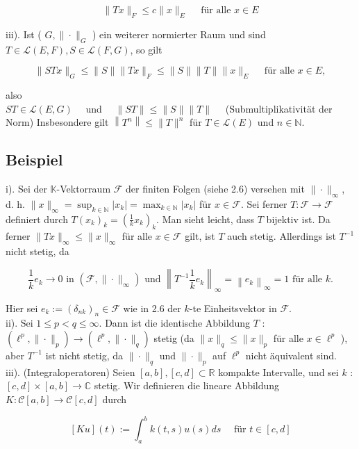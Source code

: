 \documentclass[10pt, letterpaper]{article}
\begin{document}
$$
\|T x\|_{F} \leq c\|x\|_{E} \quad \text { für alle } x \in E
$$

iii). Ist ( $G,\|\cdot\|_{G}$ ) ein weiterer normierter Raum und sind $T \in \mathcal{L}(E, F), S \in \mathcal{L}(F, G)$, so gilt

$$
\|S T x\|_{G} \leq\|S\|\|T x\|_{F} \leq\|S\|\|T\|\|x\|_{E} \quad \text { für alle } x \in E,
$$

also\\
$S T \in \mathcal{L}(E, G) \quad$ und $\quad\|S T\| \leq\|S\|\|T\| \quad$ (Submultiplikativität der Norm) Insbesondere gilt $\left\|T^{n}\right\| \leq\|T\|^{n}$ für $T \in \mathcal{L}(E)$ und $n \in \mathbb{N}$.

\subsection*{Beispiel}
i). Sei der $\mathbb{K}$-Vektorraum $\mathcal{F}$ der finiten Folgen (siehe 2.6) versehen mit $\|\cdot\|_{\infty}$, d. h. $\|x\|_{\infty}=\sup _{k \in \mathbb{N}}\left|x_{k}\right|=\max _{k \in \mathbb{N}}\left|x_{k}\right|$ für $x \in \mathcal{F}$. Sei ferner $T: \mathcal{F} \rightarrow \mathcal{F}$ definiert durch $T\left(x_{k}\right)_{k}=\left(\frac{1}{k} x_{k}\right)_{k}$. Man sieht leicht, dass $T$ bijektiv ist. Da ferner $\|T x\|_{\infty} \leq\|x\|_{\infty}$ für alle $x \in \mathcal{F}$ gilt, ist $T$ auch stetig. Allerdings ist $T^{-1}$ nicht stetig, da

$$
\frac{1}{k} e_{k} \rightarrow 0 \text { in }\left(\mathcal{F},\|\cdot\|_{\infty}\right) \text { und }\left\|T^{-1} \frac{1}{k} e_{k}\right\|_{\infty}=\left\|e_{k}\right\|_{\infty}=1 \text { für alle } k .
$$

Hier sei $e_{k}:=\left(\delta_{n k}\right)_{n} \in \mathcal{F}$ wie in 2.6 der $k$-te Einheitsvektor in $\mathcal{F}$.\\
ii). Sei $1 \leq p<q \leq \infty$. Dann ist die identische Abbildung $T$ : $\left(\ell^{p},\|\cdot\|_{p}\right) \rightarrow\left(\ell^{p},\|\cdot\|_{q}\right)$ stetig (da $\|x\|_{q} \leq\|x\|_{p}$ für alle $x \in \ell^{p}$ ), aber $T^{-1}$ ist nicht stetig, da $\|\cdot\|_{q}$ und $\|\cdot\|_{p}$ auf $\ell^{p}$ nicht äquivalent sind.\\
iii). (Integraloperatoren) Seien $[a, b],[c, d] \subset \mathbb{R}$ kompakte Intervalle, und sei $k$ : $[c, d] \times[a, b] \rightarrow \mathbb{C}$ stetig. Wir definieren die lineare Abbildung $K: \mathcal{C}[a, b] \rightarrow \mathcal{C}[c, d]$ durch

$$
[K u](t):=\int_{a}^{b} k(t, s) u(s) d s \quad \text { für } t \in[c, d]
$$
\end{document}
